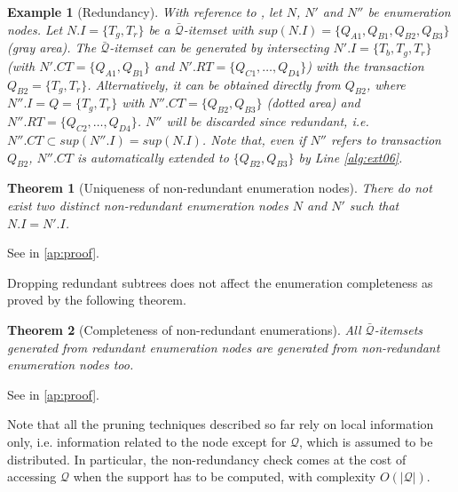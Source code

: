 \documentclass[preprint,12pt,authoryear]{elsarticle} %
\newtheorem{theorem}{Theorem}
\newtheorem{example}{Example}
\begin{document}
\begin{example}[Redundancy]
\label{ex:redundancy}
With reference to , let $N$, $N'$ and $N''$ be enumeration nodes.
Let $N.I=\{T_g,T_r\}$ be a $\bar{\mathcal{Q}}$-itemset with $sup(N.I)=\{Q_{A1},Q_{B1},Q_{B2},Q_{B3}\}$ (gray area).
The $\bar{\mathcal{Q}}$-itemset can be generated by intersecting $N'.I=\{T_b,T_g,T_r\}$ (with $N'.CT=\{Q_{A1},Q_{B1}\}$ and $N'.RT=\{Q_{C1},\ldots,Q_{D4}\}$) with the transaction $Q_{B2}=\{T_g,T_r\}$.
Alternatively, it can be obtained directly from $Q_{B2}$, where $N''.I=Q=\{T_g,T_r\}$ with $N''.CT=\{Q_{B2},Q_{B3}\}$ (dotted area) and $N''.RT=\{Q_{C2},\ldots,Q_{D4}\}$.
$N''$ will be discarded since redundant, i.e. $N''.CT \subset sup(N''.I)=sup(N.I)$.
Note that, even if $N''$ refers to transaction $Q_{B2}$, $N''.CT$ is automatically extended to $\{Q_{B2},Q_{B3}\}$ by  Line \ref{alg:ext06}.
\end{example}


\begin{theorem}[Uniqueness of non-redundant enumeration nodes]
There do not exist two distinct non-redundant enumeration nodes $N$ and $N'$ such that $N.I=N'.I$.
\end{theorem}
See  in \ref{ap:proof}.

Dropping redundant %
subtrees does not affect the enumeration completeness as proved by the following theorem.

\begin{theorem}[Completeness of non-redundant enumerations]
All $\bar{\mathcal{Q}}$-itemsets generated from redundant enumeration nodes are generated from non-redundant enumeration nodes too.
\end{theorem}
See  in \ref{ap:proof}.

Note that all the pruning techniques described so far rely on local information only, i.e. information related to the node except for $\mathcal{Q}$, which is assumed to be distributed.
In particular, the non-redundancy check comes at the cost of accessing $\mathcal{Q}$ when the support has to be computed, with complexity $O(|\mathcal{Q}|)$.
\end{document}

